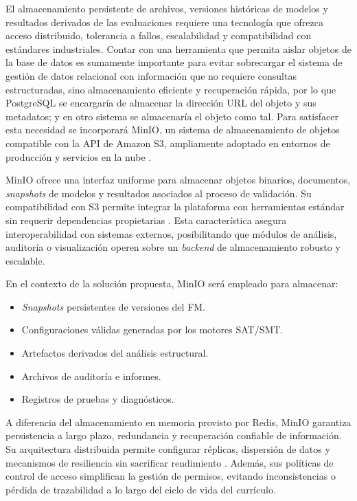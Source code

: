 El almacenamiento persistente de archivos, versiones históricas de modelos y 
resultados derivados de las evaluaciones requiere una tecnología que ofrezca 
acceso distribuido, tolerancia a fallos, escalabilidad y compatibilidad con 
estándares industriales. Contar con una herramienta que permita aislar objetos de la base de datos
es sumamente importante para evitar sobrecargar el sistema de gestión de datos relacional 
con información que no requiere consultas estructuradas, sino almacenamiento eficiente y recuperación rápida, 
por lo que PostgreSQL se encargaría de almacenar la dirección \ac{URL} del objeto y sus metadatos; y
en otro sistema se almacenaría el objeto como tal.
Para satisfacer esta necesidad se incorporará 
MinIO, un sistema de almacenamiento de objetos compatible con la \ac{API} de 
Amazon \ac{S3}, ampliamente adoptado en entornos de producción y servicios en la nube 
\citep{minio2024docs}.

MinIO ofrece una interfaz uniforme para almacenar objetos binarios, documentos, 
\textit{snapshots} de modelos y resultados asociados al proceso de validación. Su 
compatibilidad con \ac{S3} permite integrar la plataforma con herramientas estándar 
sin requerir dependencias propietarias \citep{adler2023evaluating}. Esta 
característica asegura interoperabilidad con sistemas externos, posibilitando 
que módulos de análisis, auditoría o visualización operen sobre un \textit{backend} 
de almacenamiento robusto y escalable.

En el contexto de la solución propuesta, MinIO será empleado para almacenar:  
\begin{itemize}
    \item \textit{Snapshots} persistentes de versiones del \ac{FM}.
    \item Configuraciones válidas generadas por los motores \ac{SAT}/\ac{SMT}.
    \item Artefactos derivados del análisis estructural.
    \item Archivos de auditoría e informes.
    \item Registros de pruebas y diagnósticos.
\end{itemize}

A diferencia del almacenamiento en memoria provisto por Redis, MinIO garantiza 
persistencia a largo plazo, redundancia y recuperación confiable de información. 
Su arquitectura distribuida permite configurar réplicas, dispersión de datos y 
mecanismos de resiliencia sin sacrificar rendimiento \citep{adler2023evaluating}. 
Además, sus políticas de control de acceso simplifican la gestión de permisos, 
evitando inconsistencias o pérdida de trazabilidad a lo largo del ciclo de vida 
del currículo.

